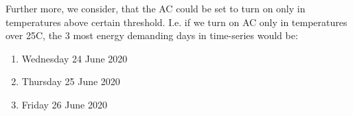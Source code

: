 \documentclass{article}
\begin{document}
\bigskip
\bigskip
Further more, we consider, that the AC could be set to turn on only in temperatures above certain threshold. I.e. if we turn on AC only in temperatures over 25\°C, the 3 most energy demanding days in time-series would be:
\begin{enumerate}
\item Wednesday 24 June 2020
\item Thursday 25 June 2020
\item Friday 26 June 2020
\end{enumerate}

\newpage



\end{document}
